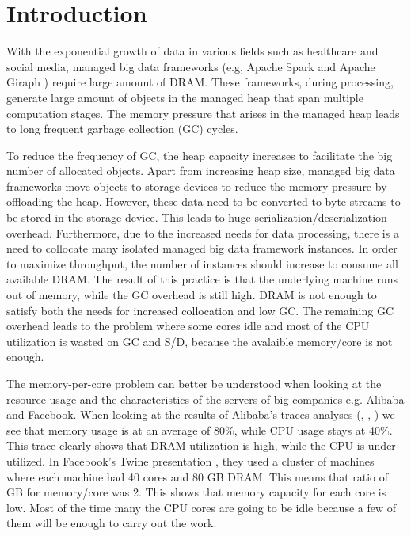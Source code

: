 \section{Introduction}
\label{sec:intro}

With the exponential growth of data in various fields such as
healthcare and social media, managed big data frameworks (e.g, Apache Spark \cite{Spark} and
Apache Giraph \cite{Giraph}) require large amount of DRAM. 
These frameworks, during processing, generate large amount of objects
in the managed heap that span multiple computation stages.
The memory pressure that arises in the managed heap leads to long frequent garbage
collection (GC) cycles.

To reduce the frequency of GC, the heap capacity increases to
facilitate the big number of allocated objects. Apart from
increasing heap size, managed big data frameworks move objects to
storage devices to reduce the memory pressure by offloading the heap. 
However, these data need to be converted to byte streams to be stored in the storage device.
This leads to huge serialization/deserialization overhead.
Furthermore, due to the increased needs for data processing, there is a need to collocate
many isolated managed big data framework instances. In order to maximize throughput,
the number of instances should increase to consume all available DRAM.
The result of this practice is that the underlying machine runs out of
memory, while the GC overhead is still high. DRAM is not enough to satisfy both the needs
for increased collocation and low GC.
The remaining GC overhead leads to the problem where some cores idle and most of the CPU utilization is wasted
on GC and S/D, because the avalaible memory/core is not enough.

The memory-per-core problem can better be understood when looking at
the resource usage and the characteristics of the servers of big
companies e.g. Alibaba and Facebook. When looking at the results of
Alibaba's traces analyses (\cite{Alibaba}, \cite{Alibaba1}, \cite{Alibabacolocated}) we see that memory usage is at
an average of 80\%, while CPU usage stays at 40\%. This trace clearly
shows that DRAM utilization is high, while the CPU is under-utilized.
In Facebook's Twine presentation \cite{Twine}, they used a cluster of
machines where each machine had 40 cores and 80 GB DRAM. This means
that ratio of GB for memory/core was 2. This shows that memory capacity for each core is low. Most of the time many the CPU cores are going to be idle
because a few of them will be enough to carry out the work.

